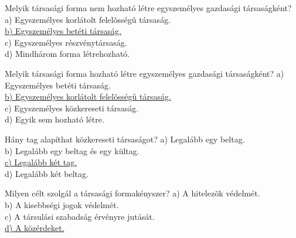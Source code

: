 \begin{frame}

\begin{tcolorbox}[title={63. Kérdés}]
Melyik társasági forma nem hozható létre egyszemélyes gazdasági társaságként?
\tcblower
a) Egyszemélyes korlátolt felelõsségû társaság.\\
\uline {b) Egyszemélyes betéti társaság.}\\
c) Egyszemélyes részvénytársaság.\\
d) Mindhárom forma létrehozható.
\end{tcolorbox}

\begin{tcolorbox}[title={64. Kérdés}]
Melyik társasági forma hozható létre egyszemélyes gazdasági társaságként?
\tcblower
a) Egyszemélyes betéti társaság.\\
\uline {b) Egyszemélyes korlátolt felelõsségû társaság.}\\
c) Egyszemélyes közkereseti társaság.\\
d) Egyik sem hozható létre.
\end{tcolorbox}

\begin{tcolorbox}[title={65. Kérdés}]
Hány tag alapíthat közkereseti társaságot?
\tcblower
a) Legalább egy beltag.\\
b) Legalább egy beltag és egy kültag.\\
\uline {c) Legalább két tag.}\\
d) Legalább két beltag.
\end{tcolorbox}

\begin{tcolorbox}[title={66. Kérdés}]
Milyen célt szolgál a társasági formakényszer?
\tcblower
a) A hitelezõk védelmét.\\
b) A kisebbségi jogok védelmét.\\
c) A társulási szabadság érvényre jutását.\\
\uline {d) A közérdeket.}
\end{tcolorbox}
 
\end{frame}


